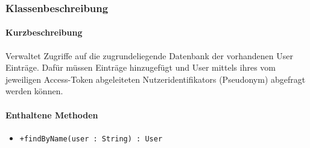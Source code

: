 \subsubsection*{Klassenbeschreibung}%
\paragraph*{Kurzbeschreibung}
Verwaltet Zugriffe auf die zugrundeliegende Datenbank der vorhandenen User Einträge.
Dafür müssen Einträge hinzugefügt und User mittels ihres vom jeweiligen Access-Token abgeleiteten Nutzeridentifikators (Pseudonym) abgefragt werden können.
\paragraph*{Enthaltene Methoden}
\begin{itemize}
    \item \texttt{+findByName(user : String) : User}
\end{itemize}
